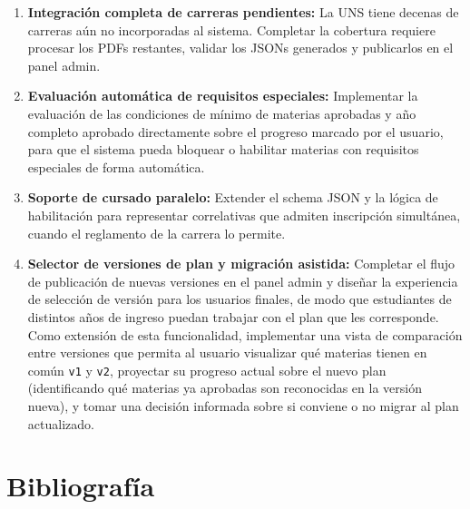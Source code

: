 \documentclass[12pt, a4paper]{report}
\begin{document}
\begin{enumerate}
  \item \textbf{Integración completa de carreras pendientes:} La UNS tiene decenas de
        carreras aún no incorporadas al sistema. Completar la cobertura requiere procesar
        los PDFs restantes, validar los JSONs generados y publicarlos en el panel admin.

  \item \textbf{Evaluación automática de requisitos especiales:} Implementar la evaluación
        de las condiciones de mínimo de materias aprobadas y año completo aprobado
        directamente sobre el progreso marcado por el usuario, para que el sistema pueda
        bloquear o habilitar materias con requisitos especiales de forma automática.

  \item \textbf{Soporte de cursado paralelo:} Extender el schema JSON y la lógica de
        habilitación para representar correlativas que admiten inscripción simultánea,
        cuando el reglamento de la carrera lo permite.

  \item \textbf{Selector de versiones de plan y migración asistida:} Completar el flujo de
        publicación de nuevas versiones en el panel admin y diseñar la experiencia de
        selección de versión para los usuarios finales, de modo que estudiantes de distintos
        años de ingreso puedan trabajar con el plan que les corresponde. Como extensión de
        esta funcionalidad, implementar una vista de comparación entre versiones que permita
        al usuario visualizar qué materias tienen en común \texttt{v1} y \texttt{v2},
        proyectar su progreso actual sobre el nuevo plan (identificando qué materias ya
        aprobadas son reconocidas en la versión nueva), y tomar una decisión informada sobre
        si conviene o no migrar al plan actualizado.
\end{enumerate}

\newpage
\chapter*{Bibliografía}
\end{document}
